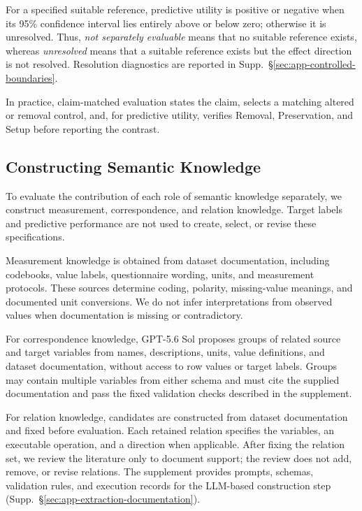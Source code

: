 \documentclass{article} %
\newcommand{\supp}[1]{\textnormal{Supp.~#1}}
\begin{document}
For a specified suitable reference, predictive utility is positive or negative when its 95\% confidence interval lies entirely above or below zero; otherwise it is unresolved.
Thus, \emph{not separately evaluable} means that no suitable reference exists, whereas \emph{unresolved} means that a suitable reference exists but the effect direction is not resolved.
Resolution diagnostics are reported in \supp{\S\ref{sec:app-controlled-boundaries}}.

In practice, claim-matched evaluation states the claim, selects a matching altered or removal control, and, for predictive utility, verifies Removal, Preservation, and Setup before reporting the contrast.

\subsection{Constructing Semantic Knowledge}
\label{sec:knowledge_construction}

To evaluate the contribution of each role of semantic knowledge separately, we construct measurement, correspondence, and relation knowledge.
Target labels and predictive performance are not used to create, select, or revise these specifications.

Measurement knowledge is obtained from dataset documentation, including codebooks, value labels, questionnaire wording, units, and measurement protocols.
These sources determine coding, polarity, missing-value meanings, and documented unit conversions.
We do not infer interpretations from observed values when documentation is missing or contradictory.

For correspondence knowledge, GPT-5.6 Sol proposes groups of related source and target variables from names, descriptions, units, value definitions, and dataset documentation, without access to row values or target labels.
Groups may contain multiple variables from either schema and must cite the supplied documentation and pass the fixed validation checks described in the supplement.

For relation knowledge, candidates are constructed from dataset documentation and fixed before evaluation.
Each retained relation specifies the variables, an executable operation, and a direction when applicable.
After fixing the relation set, we review the literature only to document support; the review does not add, remove, or revise relations.
The supplement provides prompts, schemas, validation rules, and execution records for the LLM-based construction step (\supp{\S\ref{sec:app-extraction-documentation}}).
\end{document}
